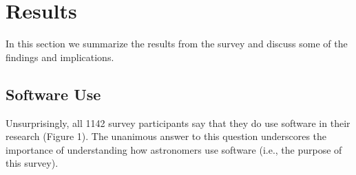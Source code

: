 \section{Results}
\label{sec:res}

In this section we summarize the results from the survey and discuss some of the findings and implications.

\subsection{Software Use}
Unsurprisingly, all 1142 survey participants say that they do use software in their research (Figure 1). The unanimous answer to this question underscores the importance of understanding how astronomers use software (i.e., the purpose of this survey).